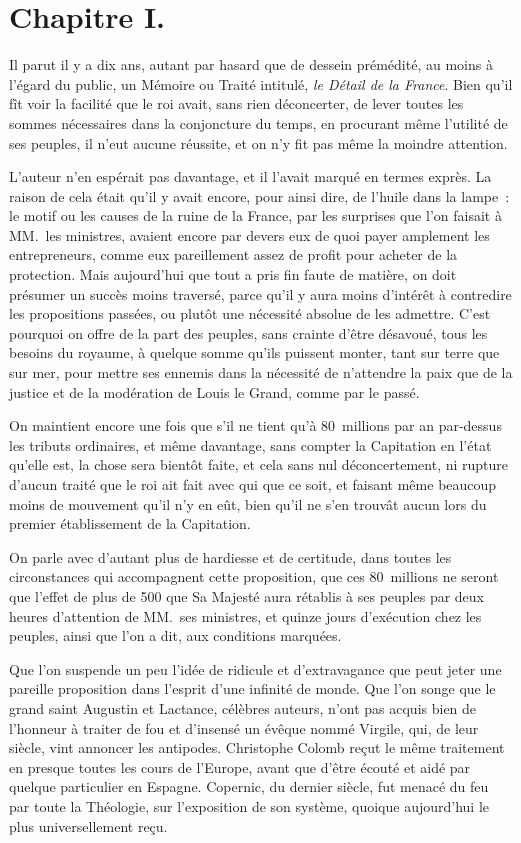 \documentclass[french,twoside]{book} %
\newcommand\chaptercont{} %
\begin{document}
\chaptercont
\section[{Chapitre I.}]{Chapitre I.}
\noindent Il parut il y a dix ans, autant par hasard que de dessein prémédité, au moins à l’égard du public, un Mémoire ou Traité intitulé, {\itshape le Détail de la France}. Bien qu’il fît voir la facilité que le roi avait, sans rien déconcerter, de lever toutes les sommes nécessaires dans la conjoncture du temps, en procurant même l’utilité de ses peuples, il n’eut aucune réussite, et on n’y fit pas même la moindre attention.\par
L’auteur n’en espérait pas davantage, et il l’avait marqué en termes exprès. La raison de cela était qu’il y avait encore, pour ainsi dire, de l’huile dans la lampe : le motif ou les causes de la ruine de la France, par les surprises que l’on faisait à MM. les ministres, avaient encore par devers eux de quoi payer amplement les entrepreneurs, comme eux pareillement assez de profit pour acheter de la protection. Mais aujourd’hui que tout a pris fin faute de matière, on doit présumer un succès moins traversé, parce qu’il y aura moins d’intérêt à contredire les propositions passées, ou plutôt une nécessité absolue de les admettre. C’est pourquoi on offre de la part des peuples, sans crainte d’être désavoué, tous les besoins du royaume, à quelque somme qu’ils puissent monter, tant sur terre que sur mer, pour mettre ses ennemis dans la nécessité de n’attendre la paix que de la justice et de la modération de Louis le Grand, comme par le passé.\par
On maintient encore une fois que s’il ne tient qu’à 80 millions par an par-dessus les tributs ordinaires, et même davantage, sans compter la Capitation en l’état qu’elle est, la chose sera bientôt faite, et cela sans nul déconcertement, ni rupture d’aucun traité que le roi ait fait avec qui que ce soit, et faisant même beaucoup moins de mouvement qu’il n’y en eût, bien qu’il ne s’en trouvât aucun lors du premier établissement de la Capitation.\par
On parle avec d’autant plus de hardiesse et de certitude, dans toutes les circonstances qui accompagnent cette proposition, que ces 80 millions ne seront que l’effet de plus de 500 que Sa Majesté aura rétablis à ses peuples par deux heures d’attention de MM. ses ministres, et quinze jours d’exécution chez les peuples, ainsi que l’on a dit, aux conditions marquées.\par
Que l’on suspende un peu l’idée de ridicule et d’extravagance que peut jeter une pareille proposition dans l’esprit d’une infinité de monde. Que l’on songe que le grand saint Augustin et Lactance, célèbres auteurs, n’ont pas acquis bien de l’honneur à traiter de fou et d’insensé un évêque nommé Virgile, qui, de leur siècle, vint annoncer les antipodes. Christophe Colomb reçut le même traitement en presque toutes les cours de l’Europe, avant que d’être écouté et aidé par quelque particulier en Espagne. Copernic, du dernier siècle, fut menacé du feu par toute la Théologie, sur l’exposition de son système, quoique aujourd’hui le plus universellement reçu.\par
\end{document}

